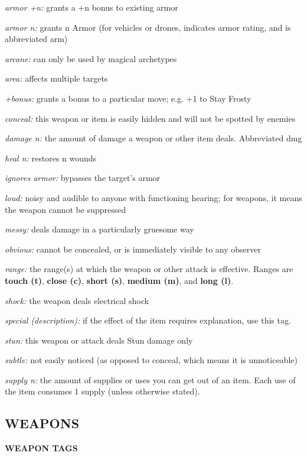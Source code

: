 \documentclass[oneside,10pt]{article}
\begin{document}
\begin{multicols}{2}
\begin{adjustwidth*}{.5cm}{.5cm}
\textit{armor +n:} grants a +n bonus to existing armor

\textit{armor n:} grants n Armor (for vehicles or drones, indicates
armor rating, and is abbreviated arm)

\textit{arcane:} can only be used by magical archetypes

\textit{area:} affects multiple targets

\textit{+bonus:} grants a bonus to a particular move; e.g. +1 to
Stay Frosty

\textit{conceal:} this weapon or item is easily hidden and will not
be spotted by enemies

\textit{damage n:} the amount of damage a weapon or other item
deals. Abbreviated dmg

\textit{heal n:} restores n wounds

\textit{ignores armor:} bypasses the target’s armor

\textit{loud:} noisy and audible to anyone with functioning hearing;
for weapons, it means the weapon cannot be
suppressed

\textit{messy:} deals damage in a particularly gruesome way

\textit{obvious:} cannot be concealed, or is immediately visible to
any observer

\textit{range:} the range(s) at which the weapon or other attack is
effective. Ranges are \textbf{touch (t)}, \textbf{close (c)}, \textbf{short
(s)}, \textbf{medium (m)}, and \textbf{long (l)}.

\textit{shock:} the weapon deals electrical shock

\textit{special (description):} if the effect of the item requires explanation, use this tag.

\textit{stun:} this weapon or attack deals Stun damage only

\textit{subtle:} not easily noticed (as opposed to conceal, which
means it is unnoticeable)

\textit{supply n:} the amount of supplies or uses you can get out
of an item. Each use of the item consumes 1 supply (unless
otherwise stated).
\end{adjustwidth*}


\subsection{WEAPONS}

\textbf{WEAPON TAGS}
\begin{adjustwidth*}{.5cm}{.5cm}


\end{adjustwidth*}
\end{multicols}
\end{document}

